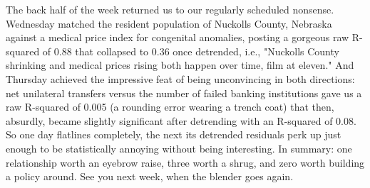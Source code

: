 The back half of the week returned us to our regularly scheduled nonsense. Wednesday matched the resident population of Nuckolls County, Nebraska against a medical price index for congenital anomalies, posting a gorgeous raw R-squared of 0.88 that collapsed to 0.36 once detrended, i.e., "Nuckolls County shrinking and medical prices rising both happen over time, film at eleven." And Thursday achieved the impressive feat of being unconvincing in both directions: net unilateral transfers versus the number of failed banking institutions gave us a raw R-squared of 0.005 (a rounding error wearing a trench coat) that then, absurdly, became slightly significant after detrending with an R-squared of 0.08. So one day flatlines completely, the next its detrended residuals perk up just enough to be statistically annoying without being interesting. In summary: one relationship worth an eyebrow raise, three worth a shrug, and zero worth building a policy around. See you next week, when the blender goes again.
